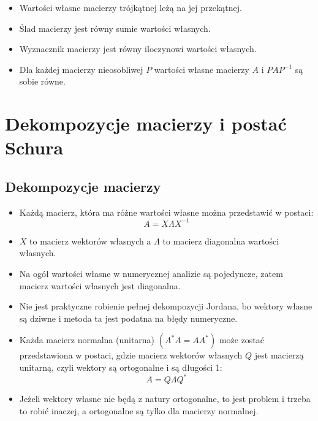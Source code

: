 \documentclass[a4paper]{article}
\begin{document}
\begin{itemize}
    \item Wartości własne macierzy trójkątnej leżą na jej przekątnej.
    \item Ślad macierzy jest równy sumie wartości własnych.
    \item Wyznacznik macierzy jest równy iloczynowi wartości własnych.
    \item Dla każdej macierzy nieosobliwej $P$ wartości własne macierzy $A$ i $PAP^{-1}$ są sobie równe.
\end{itemize}

\section{Dekompozycje macierzy i postać Schura}

\subsection{Dekompozycje macierzy}
\begin{itemize}
    \item Każdą macierz, która ma różne wartości własne można przedstawić w postaci:
    \begin{equation*}
        A = X \Lambda X^{-1}
    \end{equation*}
    \item $X$ to macierz wektorów własnych a $\Lambda$ to macierz diagonalna wartości własnych.
    \item Na ogół wartości własne w numerycznej analizie są pojedyncze, zatem macierz wartości własnych jest diagonalna.
    \item Nie jest praktyczne robienie pełnej dekompozycji Jordana, bo wektory własne są dziwne i metoda ta jest podatna na błędy numeryczne.
    \item Każda macierz normalna (unitarna) $(A^*A = AA^*)$ może zostać przedstawiona w postaci, gdzie macierz wektorów własnych $Q$ jest macierzą unitarną, czyli wektory są ortogonalne i są długości 1:
    \begin{equation*}
        A = Q \Lambda Q^*
    \end{equation*}
    \item Jeżeli wektory własne nie będą z natury ortogonalne, to jest problem i trzeba to robić inaczej, a ortogonalne są tylko dla macierzy normalnej.
\end{itemize}
\end{document}
